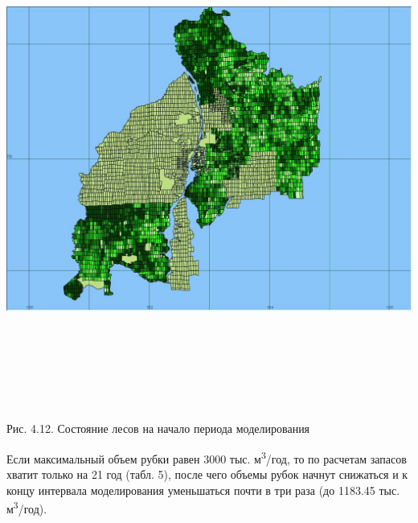 \documentclass{article}
\begin{document}
\begin{center}
\includegraphics[width=607pt, height=461pt, keepaspectratio=true]{asyaDisser9_3-fig023.jpg}

Рис. 4.12. Состояние лесов на начало периода моделирования
\end{center}

Если максимальный объем рубки равен \label{OLEHLINK34}\label{OLEHLINK35}3000 
тыс. м\textsuperscript{3}/год, то по расчетам запасов 
хватит только на 21 год (табл. 5), после чего объемы 
рубок начнут снижаться и к концу интервала 
моделирования уменьшаться почти в три раза 
(до 1183.45 тыс. м\textsuperscript{3}/год).
\end{document}
